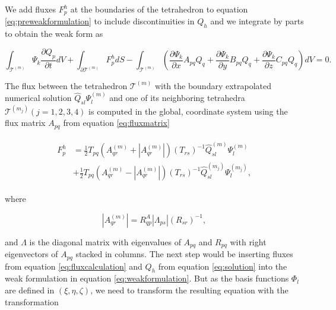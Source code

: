 We add fluxes $F_p^h$ at the boundaries of the tetrahedron to equation \ref{eq:preweakformulation} to include discontinuities in $Q_h$ and we integrate by parts to obtain the weak form as

\begin{equation}
    \int_{\mathcal{T}^{\left(m\right)}} \Psi_k \frac{\partial Q_p}{\partial t} dV + \int_{\partial \mathcal{T}^{\left(m\right)}} F_p^h dS
    - \int_{\mathcal{T}^{\left(m\right)}} \left(\frac{\partial \Psi_k}{\partial x} A_{pq}Q_q + \frac{\partial \Psi_k}{\partial y}B_{pq}Q_q
    + \frac{\partial \Psi_k}{\partial z}C_{pq}Q_q\right) dV = 0.
\label{eq:weakformulation}
\end{equation}

The flux between the tetrahedron $\mathcal{T}^{\left(m\right)}$ with the boundary extrapolated numerical solution $\hat{Q}_{sl} \Psi_l^{\left(m\right)}$
and one of its neighboring tetrahedra $\mathcal{T}^{\left(m_j\right)} \left(j=1,2,3,4\right)$ is computed in the global, coordinate system using the flux
matrix $A_{pq}$ from equation \ref{eq:fluxmatrix}

    \begin{align}
        \begin{split}
            F_p^h &= \frac{1}{2} T_{pq} \left(A_{qr}^{\left(m\right)} + \left|A_{qr}^{\left(m\right)}\right|\right)\left(T_{rs}\right)^{-1}
            \hat{Q}_{sl}^{\left(m\right)} \Psi_l^{\left(m\right)} \\
            &+ \frac{1}{2}T_{pq}\left(A_{qr}^{\left(m\right)} - \left|A_{qr}^{\left(m\right)}\right|\right)
            \left(T_{rs}\right)^{-1}\hat{Q}_{sl}^{\left(m_j\right)}\Psi_l^{\left(m_j\right)},            
        \end{split}
        \label{eq:fluxcalculation}
    \end{align}

where

\begin{equation}
\left|A_{qr}^{\left(m\right)}\right| = R_{qp}^A \left|\Lambda_{ps}\right| \left(R_{sr}\right)^{-1},
\end{equation}
    
and $\Lambda$ is the diagonal matrix with eigenvalues of $A_{pq}$ and $R_{pq}$ with right eigenvectors of $A_{pq}$ stacked in columns.
The next step would be inserting fluxes from equation \ref{eq:fluxcalculation} and $Q_h$ from equation \ref{eq:solution} into the weak
formulation in equation \ref{eq:weakformulation}. But as the basis functions $\Phi_l$ are defined in $\left(\xi, \eta, \zeta\right)$, we need
to transform the resulting equation with the transformation

